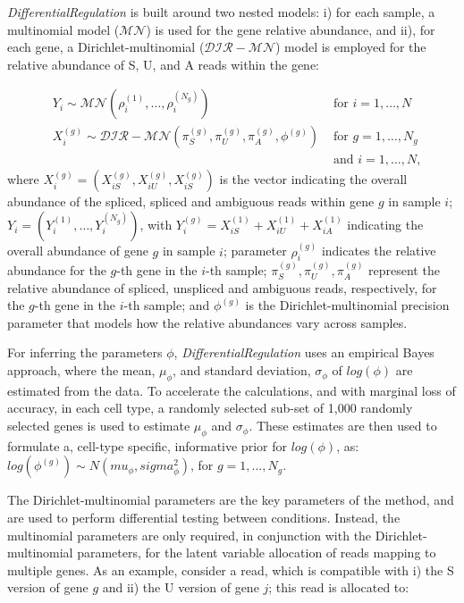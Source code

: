 \emph{DifferentialRegulation} is built around two nested models: i) for each sample, a multinomial model ($\mathcal{MN}$) is used for the gene relative abundance, and ii), for each gene, a Dirichlet-multinomial ($\mathcal{DIR}-\mathcal{MN}$) model is employed for the relative abundance of S, U, and A reads within the gene:

\begin{eqnarray}
\label{eqn:DM}
&Y_i \sim \mathcal{MN}\left( \rho_{i}^{(1)}, \dots, \rho_{i}^{(N_g)} \right) & \mbox{ for } i = 1, \dots, N \\
\label{eqn:MN}
&X_i^{(g)} \sim \mathcal{DIR}-\mathcal{MN}\left( \pi_S^{(g)}, \pi_U^{(g)}, \pi_A^{(g)}, \phi^{(g)} \right) & \mbox{ for } g = 1, \dots, N_g \\
&& \mbox{ and } i = 1, \dots, N, \nonumber
\end{eqnarray}
where $X_i^{(g)} = \left( X^{(g)}_{i S}, X^{(g)}_{i U}, X^{(g)}_{i S} \right)$ is the vector indicating the overall abundance of the spliced, spliced and ambiguous reads within gene $g$ in sample $i$;
$Y_i = \left( Y_i^{(1)}, \dots, Y_i^{(N_g)} \right)$, 
with $Y_i^{(g)} = X^{(1)}_{i S} + X^{(1)}_{i U} + X^{(1)}_{i A}$ indicating the overall abundance of gene $g$ in sample $i$;
parameter $\rho_{i}^{(g)}$ indicates the relative abundance for the $g$-th gene in the $i$-th sample;
$\pi_S^{(g)}, \pi_U^{(g)}, \pi_A^{(g)}$ represent the relative abundance of spliced, unspliced and ambiguous reads, respectively, for the $g$-th gene in the $i$-th sample; 
and $\phi^{(g)}$ is the Dirichlet-multinomial precision parameter that models how the relative abundances vary across samples.

For inferring the parameters $\phi$, \emph{DifferentialRegulation} uses an empirical Bayes approach, where the mean, $\mu_\phi$, and standard deviation, $\sigma_\phi$ of $log(\phi)$ are estimated from the data.
To accelerate the calculations, and with marginal loss of accuracy, in each cell type, a randomly selected sub-set of 1,000 randomly selected genes is used to estimate $\mu_\phi$ and $\sigma_\phi$.
These estimates are then used to formulate a, cell-type specific, informative prior for $log(\phi)$, as: $log(\phi^{(g)}) \sim N\left( mu_\phi, sigma^2_\phi \right)$, for $g  = 1, \dots, N_g$.

The Dirichlet-multinomial parameters are the key parameters of the method, and are used to perform differential testing between conditions.
Instead, the multinomial parameters are only required, in conjunction with the Dirichlet-multinomial parameters, for the latent variable allocation of reads mapping to multiple genes.
As an example, consider a read, which is compatible with i) the S version of gene $g$ and ii) the U version of gene $j$; this read is allocated to:

